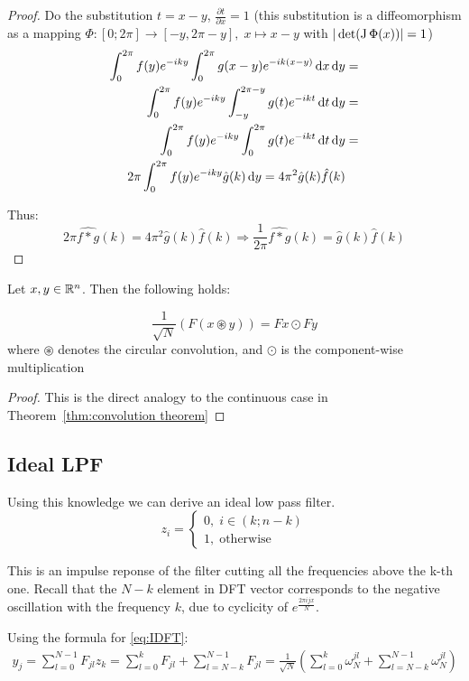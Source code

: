 \begin{proof}
	Do the substitution $t = x-y$, $\frac{\partial t}{\partial x} = 1$ (this substitution is a diffeomorphism as a mapping $\Phi:[0;2\pi]\to [-y, 2\pi - y], \; x\mapsto x-y$ with $|\det(\operatorname{J}{\Phi(x)})| = 1$)
	\[\begin{aligned}
			\int_{0}^{2\pi} f(y) e^{-iky} \int_{0}^{2\pi} g(x-y) e^{-ik(x-y)} \, \mathrm{d}x \, \mathrm{d}y
			 & = \\ \int_{0}^{2\pi} f(y) e^{-iky} \int_{-y}^{2\pi-y}g(t) e^{-ikt} \, \mathrm{d}t \, \mathrm{d}y
			 & = \\ \int_{0}^{2\pi} f(y) e^{-iky} \int_{0}^{2\pi}g(t) e^{-ikt} \, \mathrm{d}t \, \mathrm{d}y
			 & = \\ 2\pi\int_{0}^{2\pi} f(y) e^{-iky} \hat{g}(k) \, \mathrm{d}y = 4\pi^2\hat{g}(k) \hat{f}(k)\end{aligned}\]

	Thus:
	\[2\pi\widehat{f\ast g}(k)
		= 4\pi^2\hat{g}(k) \hat{f}(k) \Rightarrow
		\frac{1}{2\pi}\widehat{f\ast g}(k)
		= \hat{g}(k) \hat{f}(k)\]
\end{proof}

\begin{theorem} \label{thm:discrete convolution theorem}
	Let $x, y \in \mathbb{R}^n$. Then the following holds:

	\[\frac{1}{\sqrt N}(F(x\circledast y)) = Fx \odot Fy\]
	where $\circledast$ denotes the circular convolution, and $\odot$ is the component-wise multiplication
\end{theorem}
\begin{proof}
	This is the direct analogy to the continuous case in Theorem~\ref{thm:convolution theorem}
\end{proof}

\subsection{Ideal LPF} \label{sec:ideal lpf}
Using this knowledge we can derive an ideal low pass filter.
\[z_i = \begin{cases} 0, \;i \in (k;n-k) \\ 1, \; \text{otherwise} \end{cases}\]

This is an impulse reponse of the filter cutting all the frequencies above the k-th one. Recall that the $N-k$ element in DFT vector corresponds to the negative oscillation with the frequency $k$, due to cyclicity of $e^{\frac{2\pi i j x}{N}}$.

Using the formula for \ref{eq:IDFT}:
\[\begin{aligned}
		y_{j} = \sum_{l=0}^{N-1} F_{jl} z_k
		= \sum_{l=0}^{k} F_{jl} + \sum_{l=N-k}^{N-1} F_{jl}
		= \frac{1}{\sqrt{N}} \left(\sum_{l=0}^{k} \omega_N^{jl} + \sum_{l=N-k}^{N-1} \omega_N^{jl} \right)
	\end{aligned}\]

